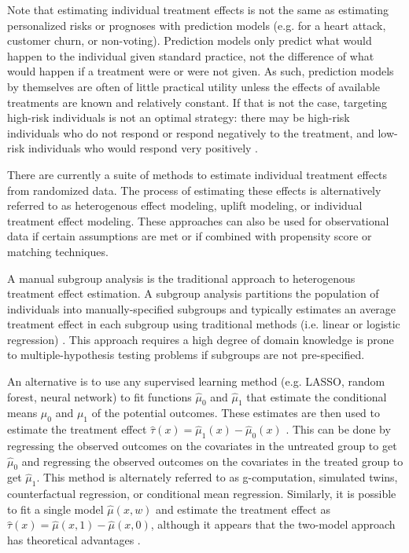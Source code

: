 Note that estimating individual treatment effects is not the same as estimating personalized risks or prognoses with prediction models (e.g. for a heart attack, customer churn, or non-voting). Prediction models only predict what would happen to the individual given standard practice, not the difference of what would happen if a treatment were or were not given. As such, prediction models by themselves are often of little practical utility unless the effects of available treatments are known and relatively constant. If that is not the case, targeting high-risk individuals is not an optimal strategy: there may be high-risk individuals who do not respond or respond negatively to the treatment, and low-risk individuals who would respond very positively \cite{Ascarza:2018ie}.

There are currently a suite of methods to estimate individual treatment effects from randomized data. The process of estimating these effects is alternatively referred to as heterogenous effect modeling, uplift modeling, or individual treatment effect modeling. These approaches can also be used for observational data if certain assumptions are met or if combined with propensity score or matching techniques.

A manual subgroup analysis is the traditional approach to heterogenous treatment effect estimation. A subgroup analysis partitions the population of individuals into manually-specified subgroups and typically estimates an average treatment effect in each subgroup using traditional methods (i.e. linear or logistic regression) \cite{Gail:1985ft}. This approach requires a high degree of domain knowledge is prone to multiple-hypothesis testing problems if subgroups are not pre-specified. 

An alternative is to use any supervised learning method (e.g. LASSO, random forest, neural network) to fit functions $\hat\mu_0$ and $\hat\mu_1$ that estimate the conditional means $\mu_0$ and $\mu_1$ of the potential outcomes. These estimates are then used to estimate the treatment effect $\hat\tau(x) = \hat\mu_1(x) - \hat\mu_0(x)$ \cite{Gutierrez:2016tq, Austin:2012cy, Snowdn:2011ef}. This can be done by regressing the observed outcomes on the covariates in the untreated group to get $\hat\mu_0$ and regressing the observed outcomes on the covariates in the treated group to get $\hat\mu_1$. This method is alternately referred to as g-computation, simulated twins, counterfactual regression, or conditional mean regression. Similarly, it is possible to fit a single model $\hat\mu(x,w)$ and estimate the treatment effect as $\hat\tau(x) = \hat\mu(x,1) - \hat\mu(x,0)$, although it appears that the two-model approach has theoretical advantages \cite{Alaa:tj}.

